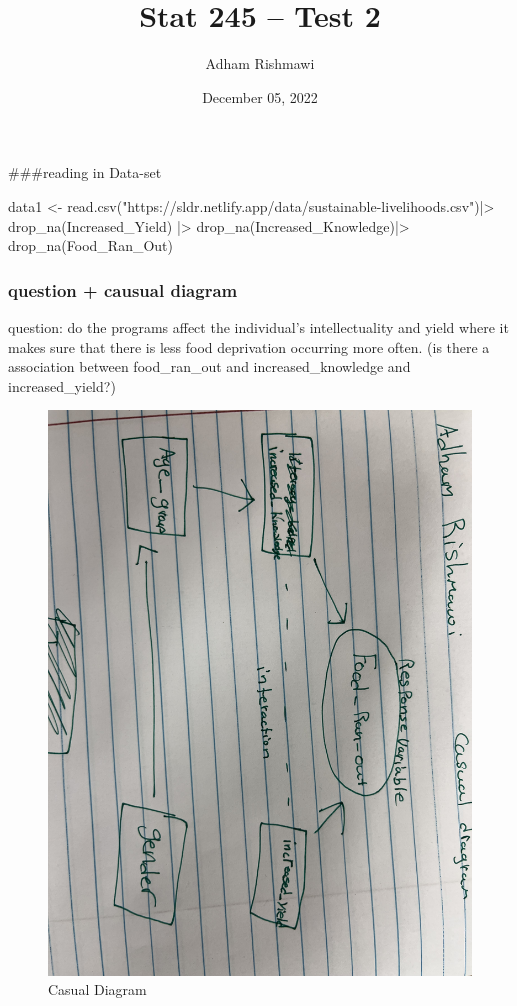 \documentclass[
]{article}
\title{Stat 245 -- Test 2}
\author{Adham Rishmawi}
\date{December 05, 2022}
\newenvironment{Shaded}{\begin{snugshade}}{\end{snugshade}}
\newcommand{\FunctionTok}[1]{\textcolor[rgb]{0.00,0.00,0.00}{#1}}
\newcommand{\NormalTok}[1]{#1}
\newcommand{\OtherTok}[1]{\textcolor[rgb]{0.56,0.35,0.01}{#1}}
\newcommand{\SpecialCharTok}[1]{\textcolor[rgb]{0.00,0.00,0.00}{#1}}
\newcommand{\StringTok}[1]{\textcolor[rgb]{0.31,0.60,0.02}{#1}}
\begin{document}
\maketitle

\#\#\#reading in Data-set

\begin{Shaded}
\begin{Highlighting}[]
\NormalTok{data1 }\OtherTok{\textless{}{-}} \FunctionTok{read.csv}\NormalTok{(}\StringTok{"https://sldr.netlify.app/data/sustainable{-}livelihoods.csv"}\NormalTok{)}\SpecialCharTok{|\textgreater{}}
  \FunctionTok{drop\_na}\NormalTok{(Increased\_Yield) }\SpecialCharTok{|\textgreater{}}
  \FunctionTok{drop\_na}\NormalTok{(Increased\_Knowledge)}\SpecialCharTok{|\textgreater{}}
  \FunctionTok{drop\_na}\NormalTok{(Food\_Ran\_Out)}
\end{Highlighting}
\end{Shaded}

\hypertarget{question-causual-diagram}{%
\subsubsection{question + causual
diagram}\label{question-causual-diagram}}

question: do the programs affect the individual's intellectuality and
yield where it makes sure that there is less food deprivation occurring
more often. (is there a association between food\_ran\_out and
increased\_knowledge and increased\_yield?)

\begin{figure}
\centering
\includegraphics{cas_diag.jpg}
\caption{Casual Diagram}
\end{figure}
\end{document}
